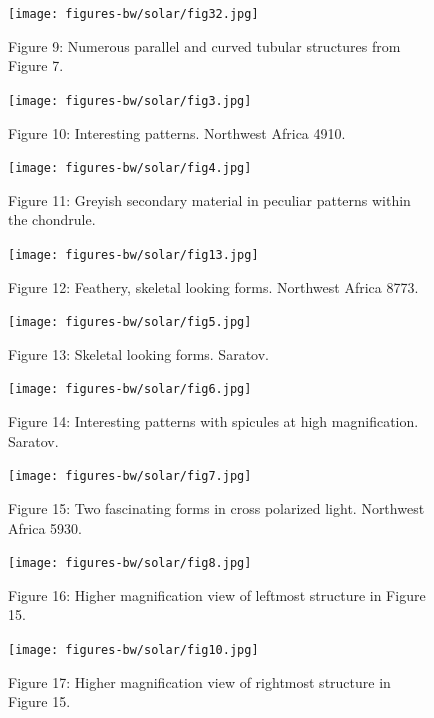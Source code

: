 \documentclass[a4paper, 12pt, oneside]{article}
\begin{document}
\begin{figure}[b]
\texttt{[image: figures-bw/solar/fig32.jpg]}
\caption{Figure 9: Numerous parallel and curved tubular structures from Figure 7.}
\centering
\end{figure}
\clearpage

\begin{figure}[b]
\centering
\texttt{[image: figures-bw/solar/fig3.jpg]}
\caption{Figure 10: Interesting patterns. Northwest Africa 4910.}
\end{figure}
\clearpage

\begin{figure}[b]
\centering
\texttt{[image: figures-bw/solar/fig4.jpg]}
\caption{Figure 11: Greyish secondary material in peculiar patterns within the chondrule.}
\end{figure}
\clearpage

\begin{figure}[b]
\centering
\texttt{[image: figures-bw/solar/fig13.jpg]}
\caption{Figure 12: Feathery, skeletal looking forms. Northwest Africa 8773.}
\end{figure}
\clearpage

\begin{figure}[b]
\texttt{[image: figures-bw/solar/fig5.jpg]}
\caption{Figure 13: Skeletal looking forms. Saratov.}
\centering
\end{figure}
\clearpage

\begin{figure}[b]
\texttt{[image: figures-bw/solar/fig6.jpg]}
\caption{Figure 14: Interesting patterns with spicules at high magnification. Saratov.}
\centering
\end{figure}
\clearpage

\begin{figure}[b]
\texttt{[image: figures-bw/solar/fig7.jpg]}
\caption{Figure 15: Two fascinating forms in cross polarized light. Northwest Africa 5930.}
\centering
\end{figure}
\clearpage

\begin{figure}[b]
\texttt{[image: figures-bw/solar/fig8.jpg]}
\caption{Figure 16: Higher magnification view of leftmost structure in Figure 15.}
\centering
\end{figure}

\begin{figure}[b]
\texttt{[image: figures-bw/solar/fig10.jpg]}
\caption{Figure 17: Higher magnification view of rightmost structure in Figure 15.}
\centering
\end{figure}
\clearpage
\end{document}

